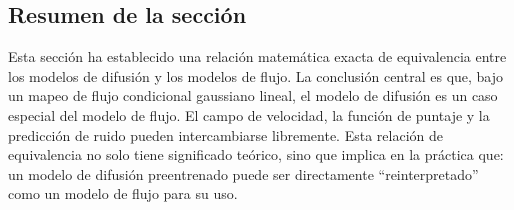 \subsection{Resumen de la sección}

Esta sección ha establecido una relación matemática exacta de equivalencia entre los modelos de difusión y los modelos de flujo. La conclusión central es que, bajo un mapeo de flujo condicional gaussiano lineal, el modelo de difusión es un caso especial del modelo de flujo. El campo de velocidad, la función de puntaje y la predicción de ruido pueden intercambiarse libremente. Esta relación de equivalencia no solo tiene significado teórico, sino que implica en la práctica que: un modelo de difusión preentrenado puede ser directamente ``reinterpretado'' como un modelo de flujo para su uso.

